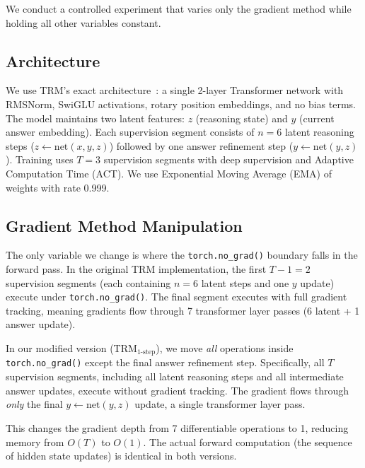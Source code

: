 \documentclass{article}
\begin{document}
We conduct a controlled experiment that varies only the gradient method while holding all other variables constant.

\subsection{Architecture}

We use TRM's exact architecture~\cite{jolicoeur2025trm}: a single 2-layer Transformer network with RMSNorm, SwiGLU activations, rotary position embeddings, and no bias terms. The model maintains two latent features: $z$ (reasoning state) and $y$ (current answer embedding). Each supervision segment consists of $n=6$ latent reasoning steps ($z \leftarrow \text{net}(x, y, z)$) followed by one answer refinement step ($y \leftarrow \text{net}(y, z)$). Training uses $T=3$ supervision segments with deep supervision and Adaptive Computation Time (ACT). We use Exponential Moving Average (EMA) of weights with rate 0.999.

\subsection{Gradient Method Manipulation}

The only variable we change is where the \texttt{torch.no\_grad()} boundary falls in the forward pass. In the original TRM implementation, the first $T-1=2$ supervision segments (each containing $n=6$ latent steps and one $y$ update) execute under \texttt{torch.no\_grad()}. The final segment executes with full gradient tracking, meaning gradients flow through 7 transformer layer passes (6 latent + 1 answer update).

In our modified version (TRM$_{\text{1-step}}$), we move \emph{all} operations inside \texttt{torch.no\_grad()} except the final answer refinement step. Specifically, all $T$ supervision segments, including all latent reasoning steps and all intermediate answer updates, execute without gradient tracking. The gradient flows through \emph{only} the final $y \leftarrow \text{net}(y, z)$ update, a single transformer layer pass.

This changes the gradient depth from 7 differentiable operations to 1, reducing memory from $O(T)$ to $O(1)$. The actual forward computation (the sequence of hidden state updates) is identical in both versions.
\end{document}
